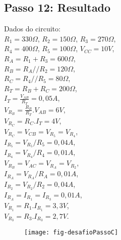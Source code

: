 \subsection{Passo 12: Resultado }

\begin{minipage}{\linewidth}
  \centering
  \begin{minipage}{0.45\linewidth}
    Dados do circuito: \\
                $R_1 = 330\Omega$,
                $R_2 = 150\Omega$,
                $R_3 = 270\Omega$, \\
                $R_4 = 400\Omega$,
                $R_5 = 100\Omega$,
                $V_{CC} = 10V$, \\
                $R_A = R_1 + R_3 = 600\Omega$, \\
                $R_B = R_A // R_2 = 120\Omega$, \\
                $R_C = R_4 // R_5 = 80\Omega$, \\
                $R_T = R_B + R_C = 200\Omega$, \\
                \color{blue}
                $I_T = \frac{V_{AB}}{R_T} = 0,05 A$,\\
                \color{red}
                $V_{R_B} = \frac{R_B}{R_T} . V_{AB} = 6V$,\\
                $V_{R_C} = R_C.I_T = 4V$, \\
                $V_{R_C} = V_{CB} = V_{R_5} = V_{R_4}$,\\
                \color{blue}
                $I_{R_5} = V_{R_5} / R_5 = 0,04 A $, \\
                $I_{R_4} = V_{R_4} / R_4 = 0,01 A$, \\
                \color{red}
                $V_{R_B} = V_{AC} = V_{R_A} = V_{R_2}$, \\
                \color{blue}
                $I_{R_A} = V_{R_A} / R_A = 0,01 A$, \\
                $I_{R_2} = V_{R_2} / R_2 = 0,04 A$, \\
                $I_{R_A} = I_{R_1} = I_{R_3} = 0,01 A$, \\
                \color{red}
                $V_{R_1} = R_1 . I_{R_1} = 3,3 V$, \\
                $V_{R_3} = R_3 . I_{R_3} = 2,7 V$.
  \end{minipage}
  \hspace{0.05\linewidth}
  \begin{minipage}{0.45\linewidth}
    \begin{figure}[H]
      \centering
      \texttt{[image: fig-desafioPassoC]}
    \end{figure}
  \end{minipage}
\end{minipage}
